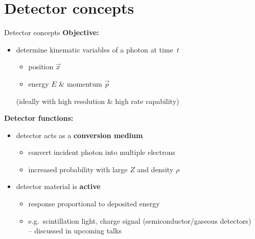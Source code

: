 \documentclass[11pt,xcolor=dvipsnames,professionalfonts]{beamer}
\begin{document}

\section{Detector concepts}

\begin{frame}{Detector concepts}
	\textbf{Objective:}
	\begin{itemize}
		\setlength\itemsep{1.0em}
		\item  determine kinematic variables of a photon at time~$t$
		\begin{itemize}
			\item position $\vec{x}$
			\item energy $E$ \& momentum $\vec{p}$
		\end{itemize}
		(ideally with high resolution \& high rate capability)
	\end{itemize}
	\vfill
	\pause
	\textbf{Detector functions:}
	\begin{itemize}
		\setlength\itemsep{1.0em}
		\item detector acts as a \textbf{conversion medium}
		\begin{itemize}
			\item convert incident photon into multiple electrons
			\item increased probability with large $Z$ and density $\rho$
		\end{itemize}
		
		\pause
		
		\item detector material is \textbf{active}
		\begin{itemize}
			\item response proportional to deposited energy
			\item e.g.\ scintillation light, charge signal (semiconductor/gaseous detectors)\\
			-- discussed in upcoming talks
		\end{itemize} 
	\end{itemize}
	
\end{frame}

\end{document}
